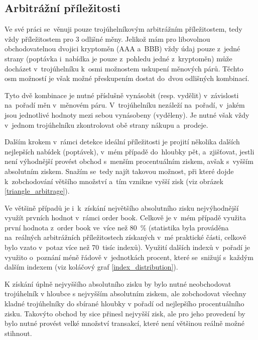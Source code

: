 \documentclass[thesis=B,czech]{FITthesis}[2019/03/21]
\begin{document}
\subsection{Arbitrážní příležitosti}
Ve své práci se~věnuji pouze trojúhelníkovým arbitrážním příležitostem, tedy vždy příležitostem pro 3 odlišné měny. Jelikož mám pro libovolnou obchodovatelnou dvojici kryptoměn (AAA a~BBB) vždy údaj pouze z~jedné strany (poptávka i~nabídka je pouze z~pohledu jedné z~kryptoměn) může docházet v~trojúhelníku k~osmi možnostem uskupení měnových párů. Těchto osm \linebreak možností je však možné přeskupením dostat do~dvou odlišných kombinací.

Tyto dvě kombinace je nutné příslušně vynásobit (resp. vydělit) v~závislosti na~pořadí měn v~měnovém páru. V~trojúhelníku nezáleží na~pořadí, v~jakém jsou jednotlivé hodnoty mezi sebou vynásobeny (vyděleny). Je nutné však vždy v~jednom trojúhelníku zkontrolovat obě strany nákupu a~prodeje.

Dalším krokem v~rámci detekce ideální příležitosti je projití několika dalších nejlepších nabídek (poptávek), v~mém případě do~hloubky pět, a~zjišťovat, jestli není výhodnější provést obchod s~menším procentuálním ziskem, avšak s~vyšším absolutním ziskem. Snažím se~tedy najít takovou možnost, při které dojde k~zobchodování většího množství a~tím vznikne vyšší zisk (viz obrázek \ref{triangle_arbitrage}).

Ve většině případů je i~k~získání největšího absolutního zisku nejvýhodnější využít prvních hodnot v~rámci order book. Celkově je v~mém případě využita první hodnota z~order book ve~více než 80~\% (statistika byla prováděna na~reálných arbitrážních příležitostech získaných v~mé praktické části, celkově bylo vzato v~potaz více než 70~tisíc indexů). Využití dalších indexů v~pořadí je využito o~poznání méně řádově v~jednotkách procent, které se~snižují s~každým dalším indexem (viz koláčový graf \ref{index_distribution}).

K získání úplně nejvyššího absolutního zisku by bylo nutné neobchodovat trojúhelník v hloubce s nejvyšším absolutním ziskem, ale zobchodovat všechny kladné trojúhelníky do sbírané hloubky v pořadí od nejlepšího procentuálního zisku. Takovýto obchod by sice přinesl nejvyšší zisk, ale pro jeho provedení by bylo nutné provést velké množství transakcí, které není většinou reálně možné stihnout.
\end{document}
